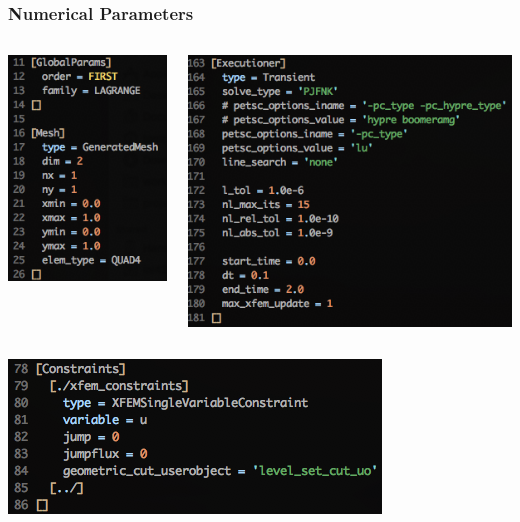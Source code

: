 \documentclass[]{beamer}
\begin{document}
\begin{frame}\frametitle{Numerical Parameters}
  	\begin{columns}
			\begin{center}
			\includegraphics[scale=0.4]{figures/Screen-GlobalParams-2Dxyls1m}
			\end{center}
			\begin{center}
			\includegraphics[scale=0.4]{figures/Screen-Executioner-2Dxyls1m}
			\end{center}
	\end{columns}
	\begin{center}
	\includegraphics[scale=0.4]{figures/Screen-Constraints-2Dxyls1m}
	\end{center}
\end{frame}
\end{document}
